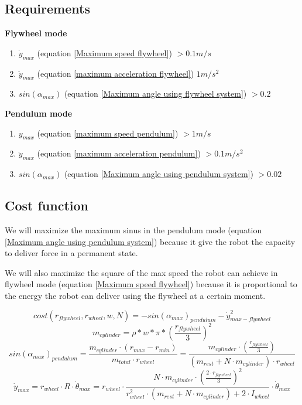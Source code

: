 \subsection{Requirements}
\textbf{Flywheel mode}
\begin{enumerate}
	\item $\dot{y}_{max}$ (equation \ref{Maximum speed flywheel}) $> 0.1m/s$
	\item $\ddot{y}_{max}$ (equation \ref{maximum acceleration flywheel}) $1m/s^2$
	\item $sin(\alpha_{max})$ (equation \ref{Maximum angle using flywheel system}) $> 0.2$
\end{enumerate}
\textbf{Pendulum mode}
\begin{enumerate}
	\item $\dot{y}_{max}$ (equation \ref{maximum speed pendulum}) $> 1m/s$
	\item $\ddot{y}_{max}$ (equation \ref{maximum acceleration pendulum}) $>0.1m/s^2$
	\item $sin(\alpha_{max})$ (equation \ref{Maximum angle using pendulum system}) $> 0.02$
\end{enumerate}
	


\subsection{Cost function}
We will maximize the maximum sinus in the pendulum mode 
(equation \ref{Maximum angle using pendulum system}) because
it give the robot the capacity to deliver force in a permanent state.

We will also maximize the square of the max speed the robot can achieve
in flywheel mode (equation \ref{Maximum speed flywheel}) because it is
proportional to the energy the robot can deliver using the flywheel at a certain moment.

\begin{equation}
	cost(r_{flywheel},r_{wheel},w,N) = - sin(\alpha_{max})_{pendulum} -\dot{y}^2_{max-flywheel}
	\label{eq: cost}
\end{equation}
\begin{equation*}
	m_{cylinder} = \rho * w * \pi * (\frac{r_{flywheel}}{3})^2
\end{equation*}
\begin{equation*}
	sin(\alpha_{max})_{pendulum} = \frac{m_{cylinder} \cdot  (r_{max} - r_{min})}{m_{total} \cdot r_{wheel}} = \frac{m_{cylinder} \cdot  (\frac{r_{flywheel}}{3})}{(m_{rest} + N \cdot m_{cylinder})\cdot r_{wheel}} 	
\end{equation*}
\begin{equation*}
	\dot{y}_{max} = r_{wheel} \cdot  R \cdot  \dot{\theta}_{max} =r_{wheel} \cdot  \frac{ N \cdot  m_{cylinder} \cdot  (\frac{2\cdot r_{flywheel}}{3})^2}
    {r_{wheel}^2\cdot (m_{rest} + N \cdot m_{cylinder}) +  2\cdot I_{wheel}} \cdot  \dot{\theta}_{max}
\end{equation*}

